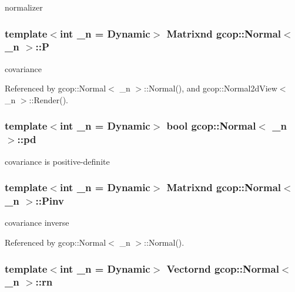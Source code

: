 normalizer 

\subsubsection[{\-P}]{\setlength{\rightskip}{0pt plus 5cm}template$<$int \-\_\-n = \-Dynamic$>$ {\bf \-Matrixnd} {\bf gcop\-::\-Normal}$<$ \-\_\-n $>$\-::{\bf \-P}}\label{classgcop_1_1Normal_ab06ae81a539288ac586d528f0157ee67}


covariance 



\-Referenced by gcop\-::\-Normal$<$ \-\_\-n $>$\-::\-Normal(), and gcop\-::\-Normal2d\-View$<$ \-\_\-n $>$\-::\-Render().

\subsubsection[{pd}]{\setlength{\rightskip}{0pt plus 5cm}template$<$int \-\_\-n = \-Dynamic$>$ bool {\bf gcop\-::\-Normal}$<$ \-\_\-n $>$\-::{\bf pd}}\label{classgcop_1_1Normal_ab49a4a70dea751c2e48ec93260f3d797}


covariance is positive-\/definite 

\subsubsection[{\-Pinv}]{\setlength{\rightskip}{0pt plus 5cm}template$<$int \-\_\-n = \-Dynamic$>$ {\bf \-Matrixnd} {\bf gcop\-::\-Normal}$<$ \-\_\-n $>$\-::{\bf \-Pinv}}\label{classgcop_1_1Normal_ab96efa301b00021f92eea26b1609d176}


covariance inverse 



\-Referenced by gcop\-::\-Normal$<$ \-\_\-n $>$\-::\-Normal().

\subsubsection[{rn}]{\setlength{\rightskip}{0pt plus 5cm}template$<$int \-\_\-n = \-Dynamic$>$ {\bf \-Vectornd} {\bf gcop\-::\-Normal}$<$ \-\_\-n $>$\-::{\bf rn}}\label{classgcop_1_1Normal_a0d14362b29d58eea8b5e9ea19d1db5a8}


